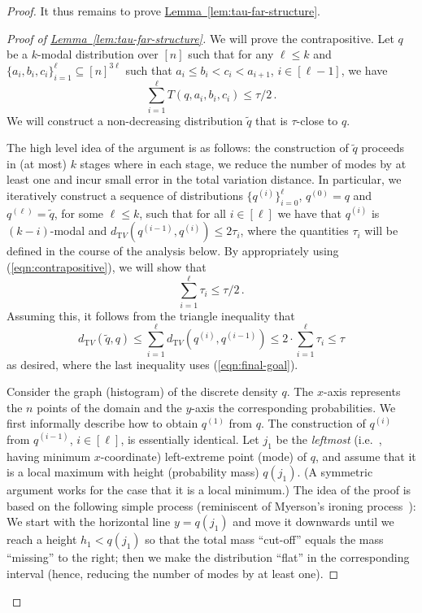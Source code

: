 \documentclass[10pt]{article}
\theoremstyle{definition}
\providecommand{\ie}{i.e.\ }
\numberwithin{equation}{section}
\newcommand{\expref}[2]{\texorpdfstring{\hyperref[#2]{#1~\ref{#2}}}{#1~\ref{#2}}}
\newcommand{\dtv}{d_{\mathrm TV}}
\begin{document}
\begin{proof}
{{}



}

\medskip

\noindent It thus remains to prove \expref{Lemma}{lem:tau-far-structure}.

\begin{proof}[Proof of \expref{Lemma}{lem:tau-far-structure}]
We will prove the contrapositive. Let $q$ be a $k$-modal distribution over $[n]$ such that
for any $\ell \le k$ and $\{a_i, b_i, c_i\}_{i=1}^{\ell} \subseteq [n]^{3\ell}$ such that $a_i \le b_i < c_i < a_{i+1}$, $i \in [\ell-1]$,
we have
\begin{equation} \label{eqn:contrapositive}
\sum_{i=1}^{\ell} T(q, a_i, b_i, c_i) \le \tau/2\,.
\end{equation}
We will construct a non-decreasing distribution $\widetilde{q}$ that is $\tau$-close to $q$. 

{The high level idea of the argument is as follows:}
the construction of $\widetilde{q}$ proceeds in {(at most)} $k$ stages
where in each stage, we reduce the number of modes by at least one and incur 
small error in the total variation distance.
In particular, we iteratively construct a sequence of distributions $\{q^{(i)} \}_{i=0}^{{\ell}}$, $q^{(0)} = q$ and $q^{({\ell})} = \widetilde{q}$,
for some ${\ell \le k}$, such that for all $i \in [{\ell}]$ we have that $q^{(i)}$ is $(k-i)$-modal and $\dtv(q^{(i-1)}, q^{(i)}) \leq {2\tau_i}$,
{where the quantities $\tau_i$ will be defined in the course
of the analysis below.}
{By appropriately using (\ref{eqn:contrapositive}), we will show that 
\begin{equation} \label{eqn:final-goal}
\sum_{i=1}^{{\ell}} \tau_i \le \tau/2\,.
\end{equation} 
Assuming this, it follows from 
the triangle inequality that
$$\dtv(\widetilde{q}, q ) \le \sum_{i=1}^{{\ell}} \dtv(q^{(i)}, q^{(i-1)}) \le 2 \cdot \sum_{i=1}^{{\ell}} \tau_i  \le \tau$$
as desired, where the last inequality uses (\ref{eqn:final-goal}).
}

\medskip

Consider the graph (histogram) of the discrete density $q$. The $x$-axis represents the $n$ points of the domain and the $y$-axis
the corresponding probabilities. We first informally describe how to obtain $q^{(1)}$ from $q$. The construction of {$q^{(i)}$ from $q^{(i-1)}$, $i \in [\ell]$,}
is {essentially} identical. Let $j_{{1}}$ be the \emph{leftmost} {(\ie, having minimum $x$-coordinate)} 
left-extreme point (mode) of $q$, and assume that it is a local maximum with height (probability mass) $q(j_{{1}})$.
(A symmetric argument works for the case that it is a local minimum.)
The idea of the proof is based on the following simple process (reminiscent of Myerson's ironing process~\cite{Myerson:81}): 
We start with the horizontal line $y = q(j_{{1}})$ and move it downwards
until we reach a height ${h_1} < q(j_{{1}})$ so that the total mass ``cut-off'' equals the mass
``missing'' to the right; then we make the distribution ``flat'' in the corresponding interval (hence, reducing the number of modes by at least one).
%
%


\end{proof}
\end{proof}
\end{document}
